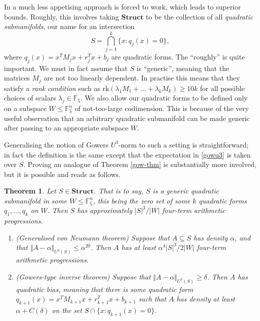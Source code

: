 \documentclass[12pt,a4paper,reqno]{amsart}
\numberwithin{equation}{section}
\theoremstyle{plain}
\newtheorem{theorem}[subsection]{Theorem}
\theoremstyle{definition}
\renewcommand{\leq}{\leqslant}
\renewcommand{\geq}{\geqslant}
\begin{document}
\noindent In \cite{green-tao-ap4s} a much less appetising approach is forced to work, which leads to superior bounds. Roughly, this involves taking $\mathbf{Struct}$ to be the collection of all \textit{quadratic submanifolds}, our name for an intersection 
\[ S = \bigcap_{j=1}^k \{x : q_j(x) = 0\},\]
where $q_j(x) = x^T M_j x + r_j^T x + b_j$ are quadratic forms. The ``roughly'' is quite important. We must in fact assume that $S$ is ``generic'', meaning that the matrices $M_j$ are not too linearly dependent. In practise this means that they satisfy a \textit{rank condition} such as $\mbox{rk}(\lambda_1 M_1 + \dots + \lambda_k M_k) \geq 10k$ for all possible choices of scalars $\lambda_j \in \mathbb{F}_5$. We also allow our quadratic forms to be defined only on a subspace $W \leq \mathbb{F}_5^n$ of not-too-large codimension. This is because of the very useful observation that an arbitrary quadratic submanifold can be made generic after passing to an appropriate subspace $W$.\vspace{11pt}

\noindent Generalising the notion of Gowers $U^3$-norm to such a setting is straightforward; in fact the definition is the same except that the expectation in \eqref{gowu3} is taken over $S$. Proving an analogue of Theorem \ref{gow-thm} is substantially more involved, but it is possible and reads as follows.

\begin{theorem}\label{gow-thm22} Let $S \in \mathbf{Struct}$. That is to say, $S$ is a generic quadratic submanifold in some $W \leq \mathbb{F}_5^n$, this being the zero set of some $k$ quadratic forms $q_1,\dots,q_k$ on $W$. Then $S$ has approximately $|S|^3/|W|$ four-term arithmetic progressions.
\begin{enumerate}
\item \textup{(Generalised von Neumann theorem)} Suppose that $A \subseteq S$ has density $\alpha$, and that $\Vert A - \alpha \Vert_{U^3(S)} \leq \alpha^{20}$. Then $A$ has at least $\alpha^4 |S|^3/2|W|$ four-term arithmetic progressions.
\item \textup{(Gowers-type inverse theorem)} Suppose that $\Vert A - \alpha \Vert_{U^3(S)} \geq \delta$. Then $A$ has quadratic bias, meaning that there is some quadratic form $q_{k+1}(x) = x^T M_{k+1} x + r_{k+1}^T x + b_{k+1}$ such that $A$ has density at least $\alpha +  C(\delta)$ on the set $S \cap \{x : q_{k+1}(x) = 0\}$.
\end{enumerate}
\end{theorem}
\end{document}
